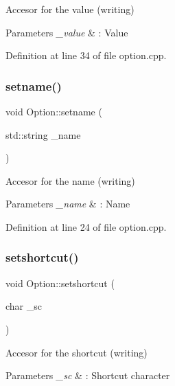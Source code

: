 Accesor for the value (writing) 


\begin{DoxyParams}{Parameters}
{\em \+\_\+value} & \+: Value \\
\hline
\end{DoxyParams}


Definition at line 34 of file option.\+cpp.

\hypertarget{class_option_a2a850c15f77b6e7e512295fba20ead9d}{}\label{class_option_a2a850c15f77b6e7e512295fba20ead9d} 
\subsubsection{\texorpdfstring{setname()}{setname()}}
{\footnotesize\ttfamily void Option\+::setname (\begin{DoxyParamCaption}\item[{std\+::string}]{\+\_\+name }\end{DoxyParamCaption})}



Accesor for the name (writing) 


\begin{DoxyParams}{Parameters}
{\em \+\_\+name} & \+: Name \\
\hline
\end{DoxyParams}


Definition at line 24 of file option.\+cpp.

\hypertarget{class_option_a33f76f0cac38ae7bb7020d7e68cb68a7}{}\label{class_option_a33f76f0cac38ae7bb7020d7e68cb68a7} 
\subsubsection{\texorpdfstring{setshortcut()}{setshortcut()}}
{\footnotesize\ttfamily void Option\+::setshortcut (\begin{DoxyParamCaption}\item[{char}]{\+\_\+sc }\end{DoxyParamCaption})}



Accesor for the shortcut (writing) 


\begin{DoxyParams}{Parameters}
{\em \+\_\+sc} & \+: Shortcut character \\
\hline
\end{DoxyParams}



